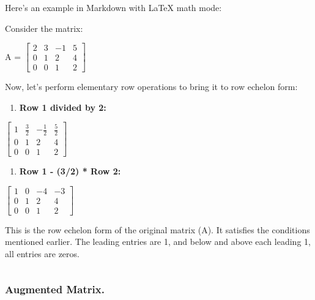 \documentclass[11pt]{article}
\makeatletter
\providecommand{\tightlist}{%
      \setlength{\itemsep}{0pt}\setlength{\parskip}{0pt}}
\newcommand{\boxspacing}{\kern\kvtcb@left@rule\kern\kvtcb@boxsep}
\newcommand{\prompt}[4]{
        {\ttfamily\llap{{\color{#2}[#3]:\hspace{3pt}#4}}\vspace{-\baselineskip}}
    }
\makeatother
\begin{document}
Here's an example in Markdown with LaTeX math mode:

Consider the matrix:

A =
\(\begin{bmatrix} 2 & 3 & -1 & 5 \\ 0 & 1 & 2 & 4 \\ 0 & 0 & 1 & 2 \end{bmatrix}\)

Now, let's perform elementary row operations to bring it to row echelon
form:

\begin{enumerate}
\def\labelenumi{\arabic{enumi}.}
\tightlist
\item
  \textbf{Row 1 divided by 2:}
\end{enumerate}

\(\begin{bmatrix} 1 & \frac{3}{2} & -\frac{1}{2} & \frac{5}{2} \\ 0 & 1 & 2 & 4 \\ 0 & 0 & 1 & 2 \end{bmatrix}\)

\begin{enumerate}
\def\labelenumi{\arabic{enumi}.}
\setcounter{enumi}{1}
\tightlist
\item
  \textbf{Row 1 - (3/2) * Row 2:}
\end{enumerate}

\(\begin{bmatrix} 1 & 0 & -4 & -3 \\ 0 & 1 & 2 & 4 \\ 0 & 0 & 1 & 2 \end{bmatrix}\)

This is the row echelon form of the original matrix (A). It satisfies
the conditions mentioned earlier. The leading entries are 1, and below
and above each leading 1, all entries are zeros.

    \begin{tcolorbox}[breakable, size=fbox, boxrule=1pt, pad at break*=1mm,colback=cellbackground, colframe=cellborder]
\prompt{In}{incolor}{ }{\boxspacing}
\begin{Verbatim}[commandchars=\\\{\}]

\end{Verbatim}
\end{tcolorbox}

    \hypertarget{augmented-matrix.}{%
\subsubsection{Augmented Matrix.}\label{augmented-matrix.}}
\end{document}
